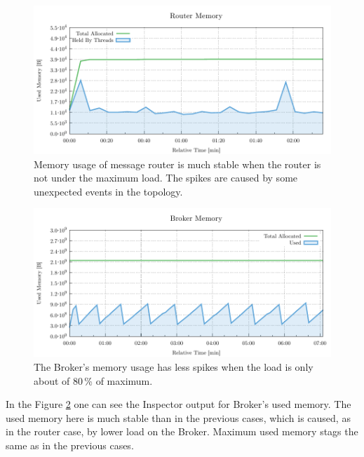 \begin{figure}[H]
	\centering
	\includegraphics[width=1\linewidth]{obrazky-figures/charts/singlepoint-router-latency-memory.pdf}
	\caption{Memory usage of message router is much stable when the router is not under the maximum load. The spikes are caused by some unexpected events in the topology.}
	\label{fig:latency-single-router-memory}
\end{figure}


\begin{figure}[H]
	\centering
	\includegraphics[width=1\linewidth]{obrazky-figures/charts/singlepoint-broker-latency-memory.pdf}
	\caption{The Broker's memory usage has less spikes when the load is only about of 80\,\% of maximum.}
	\label{fig:latency-single-broker-memory}
\end{figure}

In the Figure \ref{fig:latency-single-broker-memory} one can see the Inspector output for Broker's used memory. The used memory here is much stable than in the previous cases, which is caused, as in the router case, by lower load on the Broker. Maximum used memory stags the same as in the previous cases.

